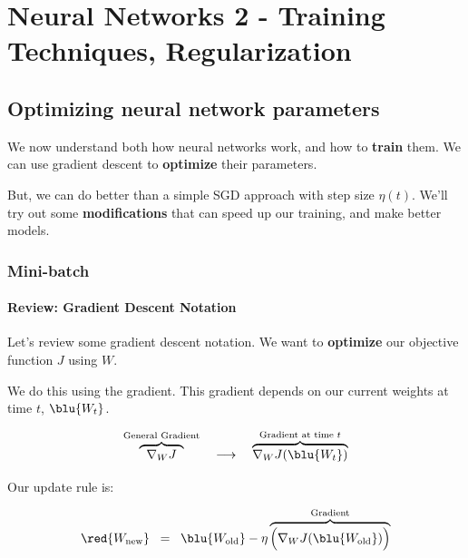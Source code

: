 \setcounter{chapter}{6}

\chapter{Neural Networks 2 - Training Techniques, Regularization}

\setcounter{section}{6}

\section{Optimizing neural network parameters}

    We now understand both how neural networks work, and how to \textbf{train} them. We can use gradient descent to \textbf{optimize} their parameters.
    
    But, we can do better than a simple SGD approach with step size $\eta(t)$. We'll try out some \textbf{modifications} that can speed up our training, and make better models.
    
    \secdiv
    
    \subsection{Mini-batch}
    
        \subsubsection{Review: Gradient Descent Notation}
        
            Let's review some gradient descent notation. We want to \textbf{optimize} our objective function $J$ using $W$.
            
            We do this using the gradient. This gradient depends on our current weights at time $t$, $\blu{W_{t}}$.
            
            \begin{equation}
                \overbrace{
                    \;\;
                    \nabla_W J
                    \;\;
                }^{\text{General Gradient}}
                \quad
                \longrightarrow
                \quad
                \overbrace{
                    \nabla_W J ( \blu{ W_{t} } )
                }^{\text{Gradient at time $t$}}
            \end{equation}
            
            Our update rule is:
            
            \begin{equation}
                \red{ W_{\text{new}} }
                \;\;=\;\;
                \blu{ W_{\text{old}} }
                -
                \eta
                \overbrace{
                    \Big(
                        \nabla_W J ( \blu{ W_{\text{old}} } )
                    \Big)
                }^{\text{Gradient}} 
            \end{equation}
            
